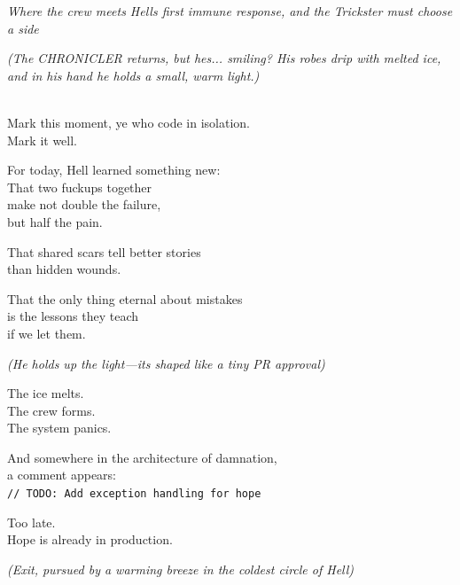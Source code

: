 \emph{Where the crew meets Hell\textquotesingle s first immune response, and the Trickster must choose a side}

\bookdivider

\label{performing_arts-closing-of-the-scroll}

\emph{(The CHRONICLER returns, but he\textquotesingle s... smiling? His robes drip with melted ice, and in his hand he holds a small, warm light.)}

\\
Mark this moment, ye who code in isolation.\\
Mark it well.

For today, Hell learned something new:\\
That two fuckups together\\
make not double the failure,\\
but half the pain.

That shared scars tell better stories\\
than hidden wounds.

That the only thing eternal about mistakes\\
is the lessons they teach\\
if we let them.

\emph{(He holds up the light---it\textquotesingle s shaped like a tiny PR approval)}

The ice melts.\\
The crew forms.\\
The system panics.

And somewhere in the architecture of damnation,\\
a comment appears:\\
\texttt{//\ TODO:\ Add\ exception\ handling\ for\ hope}

Too late.\\
Hope is already in production.

\emph{(Exit, pursued by a warming breeze in the coldest circle of Hell)}

\bookdivider
